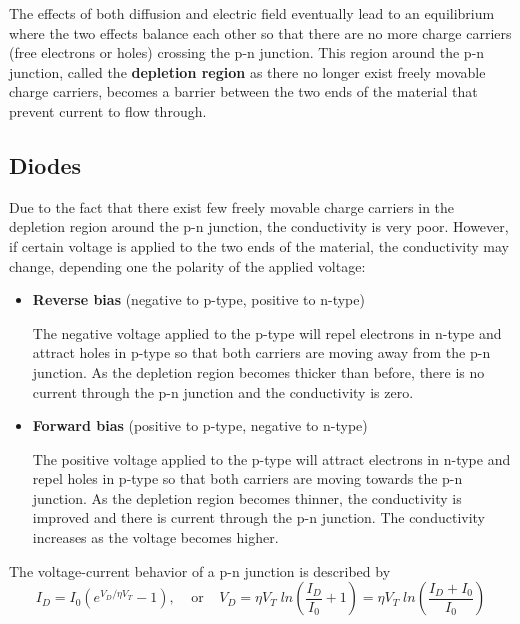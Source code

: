 \begin{itemize}
\begin{itemize}
\end{itemize}

The effects of both diffusion and electric field eventually lead to an 
equilibrium where the two effects balance each other so that there are
no more charge carriers (free electrons or holes) crossing the p-n junction.
This region around the p-n junction, called the {\bf depletion region} as 
there no longer exist freely movable charge carriers, becomes a barrier 
between the two ends of the material that prevent current to flow through.


\end{itemize}

\subsection*{Diodes}

Due to the fact that there exist few freely movable charge carriers in the
depletion region around the p-n junction, the conductivity is very poor.
However, if certain voltage is applied to the two ends of the material, 
the conductivity may change, depending one the polarity of the applied
voltage:


\begin{itemize}
\item {\bf Reverse bias} (negative to p-type, positive to n-type)

  The negative voltage applied to the p-type will repel electrons in n-type
  and attract holes in p-type so that both carriers are moving away from 
  the p-n junction. As the depletion region becomes thicker than before, 
  there is no current through the p-n junction and the conductivity is zero.

\item {\bf Forward bias} (positive to p-type, negative to n-type)

  The positive voltage applied to the p-type will attract electrons in n-type
  and repel holes in p-type so that both carriers are moving towards the p-n
  junction. As the depletion region becomes thinner, the conductivity is 
  improved and there is current through the p-n junction. The conductivity
  increases as the voltage becomes higher.
  
\end{itemize}
The voltage-current behavior of a p-n junction is described by
\[ I_D=I_0 ( e^{V_D/\eta V_T}-1 ), \;\;\;\;\mbox{or}\;\;\;\;
	V_D=\eta V_T\;ln (\frac{I_D}{I_0}+1)=\eta V_T\;ln (\frac{I_D+I_0}{I_0})	\]

